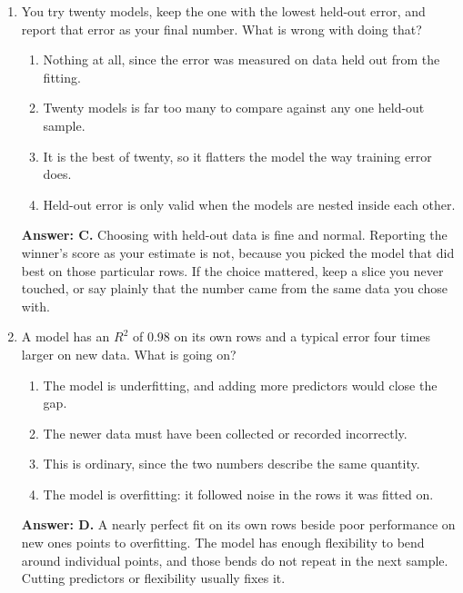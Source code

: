 \documentclass[11pt]{article}
\begin{document}
\begin{enumerate}[itemsep=14pt]
\item You try twenty models, keep the one with the lowest held-out error, and report that error as your final number. What is wrong with doing that?

\begin{enumerate}[label=\Alph*., itemsep=1pt, topsep=3pt]
  \item Nothing at all, since the error was measured on data held out from the fitting.
  \item Twenty models is far too many to compare against any one held-out sample.
  \item It is the best of twenty, so it flatters the model the way training error does.
  \item Held-out error is only valid when the models are nested inside each other.
\end{enumerate}

\vspace{2pt}
\textbf{Answer: C.} Choosing with held-out data is fine and normal. Reporting the winner's score as your estimate is not, because you picked the model that did best on those particular rows. If the choice mattered, keep a slice you never touched, or say plainly that the number came from the same data you chose with.
\vspace{4pt}

\item A model has an $R^2$ of 0.98 on its own rows and a typical error four times larger on new data. What is going on?

\begin{enumerate}[label=\Alph*., itemsep=1pt, topsep=3pt]
  \item The model is underfitting, and adding more predictors would close the gap.
  \item The newer data must have been collected or recorded incorrectly.
  \item This is ordinary, since the two numbers describe the same quantity.
  \item The model is overfitting: it followed noise in the rows it was fitted on.
\end{enumerate}

\vspace{2pt}
\textbf{Answer: D.} A nearly perfect fit on its own rows beside poor performance on new ones points to overfitting. The model has enough flexibility to bend around individual points, and those bends do not repeat in the next sample. Cutting predictors or flexibility usually fixes it.
\vspace{4pt}


\end{enumerate}
\end{document}
